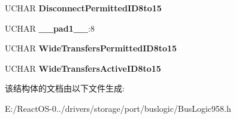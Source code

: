 \begin{DoxyCompactItemize}
U\+C\+H\+AR {\bfseries Disconnect\+Permitted\+I\+D8to15}
\item 
\mbox{\label{struct_bus_logic___setup_information_a0c99ec203aee284119525f4e3dc9597b}} 
U\+C\+H\+AR {\bfseries \+\_\+\+\_\+pad1\+\_\+\+\_\+}\+:8
\item 
\mbox{\label{struct_bus_logic___setup_information_a134ae9d50f1d5210bd1ee15ec6a76337}} 
U\+C\+H\+AR {\bfseries Wide\+Transfers\+Permitted\+I\+D8to15}
\item 
\mbox{\label{struct_bus_logic___setup_information_a843807b7a2095933bd888dfe6f114415}} 
U\+C\+H\+AR {\bfseries Wide\+Transfers\+Active\+I\+D8to15}
\end{DoxyCompactItemize}


该结构体的文档由以下文件生成\+:\begin{DoxyCompactItemize}
\item 
E\+:/\+React\+O\+S-\/0../drivers/storage/port/buslogic/Bus\+Logic958.\+h\end{DoxyCompactItemize}
